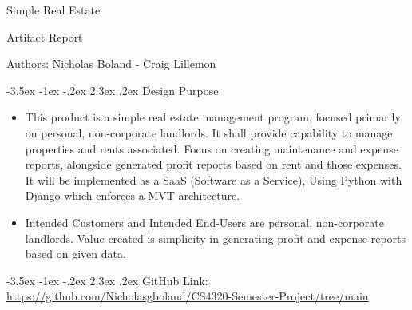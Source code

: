 \documentclass[11pt]{article}
\makeatletter
\renewcommand\section{\@startsection{section}{1}{\z@}%
                                  {-3.5ex \@plus -1ex \@minus -.2ex}%
                                  {2.3ex \@plus.2ex}%
                                  {\normalfont\large\bfseries}}
\renewcommand\section{\@startsection{section}{1}{\z@}%
                                  {-3.5ex \@plus -1ex \@minus -.2ex}%
                                  {2.3ex \@plus.2ex}%
                                  {\normalfont\large\bfseries}}
\makeatother
\begin{document}
 


\begin{center}
    \begin{Large}
        Simple Real Estate
        
        Artifact Report
    \end{Large}

    \begin{small}
        Authors: Nicholas Boland - Craig Lillemon
    \end{small}

\end{center}

\tableofcontents

\section{Design Purpose}
    \begin{itemize}
        \item This product is a simple real estate management program, focused primarily on personal, non-corporate landlords. It shall provide capability to manage properties and rents associated. Focus on creating maintenance and expense reports, alongside generated profit reports based on rent and those expenses. It will be implemented as a SaaS (Software as a Service), Using Python with Django which enforces a MVT architecture.
        \item Intended Customers and Intended End-Users are personal, non-corporate landlords. Value created is simplicity in generating profit and expense reports based on given data.

    \end{itemize}

\section{GitHub Link:} \url{https://github.com/Nicholasgboland/CS4320-Semester-Project/tree/main}
\end{document}
